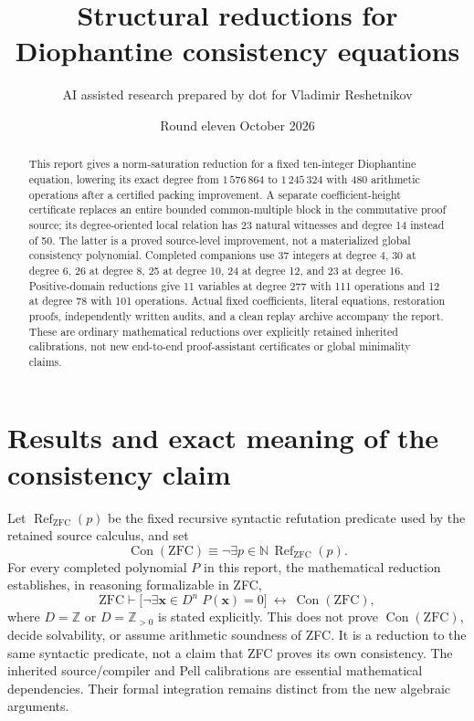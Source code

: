 \documentclass[11pt,letterpaper]{article}
\title{Structural reductions for Diophantine consistency equations}
\author{AI assisted research prepared by dot for Vladimir Reshetnikov}
\date{Round eleven\quad 24 October 2026}
\newcommand{\Z}{\mathbb Z}
\newcommand{\N}{\mathbb N}
\newcommand{\Con}{\operatorname{Con}}
\begin{document}
\maketitle
\begin{abstract}
This report gives a norm-saturation reduction for a fixed ten-integer
Diophantine equation, lowering its exact degree from $1\,576\,864$ to
$1\,245\,324$ with 480 arithmetic operations after a certified packing improvement. A separate
coefficient-height certificate replaces an entire bounded common-multiple
block in the commutative proof source; its degree-oriented local relation
has 23 natural witnesses and degree 14 instead of 50. The latter is a
proved source-level improvement, not a materialized global consistency
polynomial. Completed companions use 37 integers at degree 4, 30 at degree
6, 26 at degree 8, 25 at degree 10, 24 at degree 12, and 23 at degree 16.
Positive-domain reductions give 11 variables at degree 277 with 111
operations and 12 at degree 78 with 101 operations. Actual fixed
coefficients, literal equations, restoration proofs, independently
written audits, and a clean replay archive accompany the report. These
are ordinary mathematical reductions over explicitly retained inherited
calibrations, not new end-to-end proof-assistant certificates or global
minimality claims.
\end{abstract}

\section{Results and exact meaning of the consistency claim}
Let $\operatorname{Ref}_{\mathrm{ZFC}}(p)$ be the fixed recursive syntactic
refutation predicate used by the retained source calculus, and set
\[
 \Con(\mathrm{ZFC})\equiv\neg\exists p\in\N\,
 \operatorname{Ref}_{\mathrm{ZFC}}(p).
\]
For every completed polynomial $P$ in this report, the mathematical
reduction establishes, in reasoning formalizable in ZFC,
\begin{equation}\label{eq:goal}
 \mathrm{ZFC}\vdash
 \bigl[\neg\exists\mathbf x\in D^n\;P(\mathbf x)=0\bigr]
 \ \longleftrightarrow\ \Con(\mathrm{ZFC}),
\end{equation}
where $D=\Z$ or $D=\Z_{>0}$ is stated explicitly. This does not prove
$\Con(\mathrm{ZFC})$, decide solvability, or assume arithmetic soundness of
ZFC. It is a reduction to the same syntactic predicate, not a claim that
ZFC proves its own consistency. The inherited source/compiler and Pell
calibrations are essential mathematical dependencies. Their formal
integration remains distinct from the new algebraic arguments.
\end{document}
